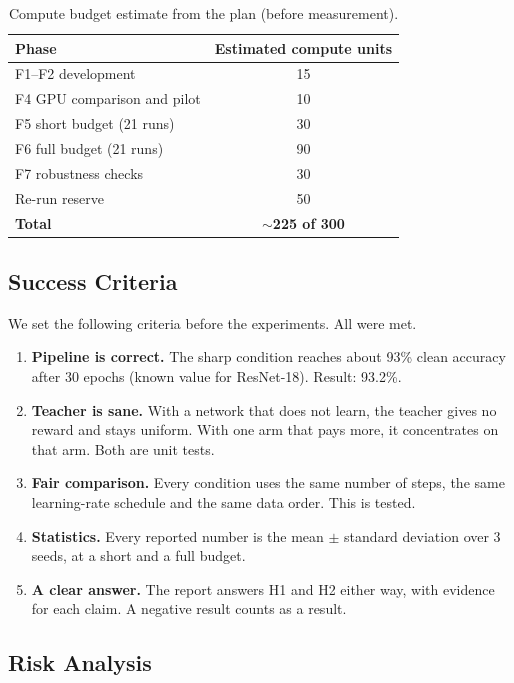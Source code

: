 \documentclass[a4paper,12pt]{report}
\begin{document}
\begin{table}[htbp]
\caption{Compute budget estimate from the plan (before measurement).}
\label{tab:budget}
\begin{center}
\small
\begin{tabular}{|l|c|} \hline
\textbf{Phase} & \textbf{Estimated compute units} \\ \hline
F1--F2 development & 15 \\
F4 GPU comparison and pilot & 10 \\
F5 short budget (21 runs) & 30 \\
F6 full budget (21 runs) & 90 \\
F7 robustness checks & 30 \\
Re-run reserve & 50 \\ \hline
\textbf{Total} & \textbf{$\sim$225 of 300} \\ \hline
\end{tabular}
\end{center}
\end{table}

\subsection{Success Criteria}

We set the following criteria before the experiments. All were met.
\begin{enumerate}
\item \textbf{Pipeline is correct.} The sharp condition reaches about 93\% clean accuracy after 30 epochs (known value for ResNet-18). Result: 93.2\%.
\item \textbf{Teacher is sane.} With a network that does not learn, the teacher gives no reward and stays uniform. With one arm that pays more, it concentrates on that arm. Both are unit tests.
\item \textbf{Fair comparison.} Every condition uses the same number of steps, the same learning-rate schedule and the same data order. This is tested.
\item \textbf{Statistics.} Every reported number is the mean $\pm$ standard deviation over 3 seeds, at a short and a full budget.
\item \textbf{A clear answer.} The report answers H1 and H2 either way, with evidence for each claim. A negative result counts as a result.
\end{enumerate}

\subsection{Risk Analysis}
\label{sec:risk}
\end{document}
